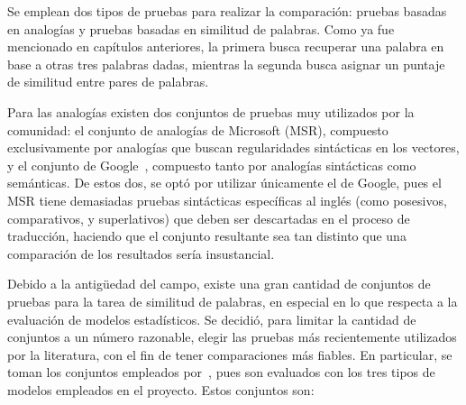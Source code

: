 Se emplean dos tipos de pruebas para realizar la comparación: pruebas basadas en analogías y pruebas
basadas en similitud de palabras. Como ya fue mencionado en capítulos anteriores, la primera busca
recuperar una palabra en base a otras tres palabras dadas, mientras la segunda busca asignar un
puntaje de similitud entre pares de palabras.

Para las analogías existen dos conjuntos de pruebas muy utilizados por la comunidad: el conjunto de
analogías de Microsoft (MSR), compuesto exclusivamente por analogías que buscan regularidades
sintácticas en los vectores, y el conjunto de Google~\cite{Mikolov2013a}, compuesto tanto por
analogías sintácticas como semánticas. De estos dos, se optó por utilizar únicamente el de Google,
pues el MSR tiene demasiadas pruebas sintácticas específicas al inglés (como posesivos,
comparativos, y superlativos) que deben ser descartadas en el proceso de traducción, haciendo que el
conjunto resultante sea tan distinto que una comparación de los resultados sería insustancial.

Debido a la antigüedad del campo, existe una gran cantidad de conjuntos de pruebas para la tarea de
similitud de palabras, en especial en lo que respecta a la evaluación de modelos estadísticos. Se
decidió, para limitar la cantidad de conjuntos a un número razonable, elegir las pruebas más
recientemente utilizados por la literatura, con el fin de tener comparaciones más fiables. En
particular, se toman los conjuntos empleados por~\cite{Levy2015}, pues son evaluados con los tres
tipos de modelos empleados en el proyecto. Estos conjuntos son:

